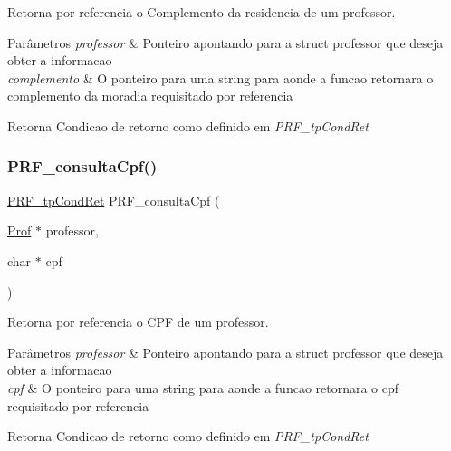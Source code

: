 Retorna por referencia o Complemento da residencia de um professor. 


\begin{DoxyParams}{Parâmetros}
{\em professor} & Ponteiro apontando para a struct professor que deseja obter a informacao \\
\hline
{\em complemento} & O ponteiro para uma string para aonde a funcao retornara o complemento da moradia requisitado por referencia \\
\hline
\end{DoxyParams}
\begin{DoxyReturn}{Retorna}
Condicao de retorno como definido em {\itshape P\+R\+F\+\_\+tp\+Cond\+Ret} 
\end{DoxyReturn}
\mbox{\label{group__funcoes_consulta_gae9e9268cbc4aad856eae4d5dbb322bc1}} 
\subsubsection{\texorpdfstring{P\+R\+F\+\_\+consulta\+Cpf()}{PRF\_consultaCpf()}}
{\footnotesize\ttfamily \hyperlink{group__modulo_professor_ga777e215896d573d2e99d98793b1f0ed1}{P\+R\+F\+\_\+tp\+Cond\+Ret} P\+R\+F\+\_\+consulta\+Cpf (\begin{DoxyParamCaption}\item[{\hyperlink{structprof}{Prof} $\ast$}]{professor,  }\item[{char $\ast$}]{cpf }\end{DoxyParamCaption})}



Retorna por referencia o C\+PF de um professor. 


\begin{DoxyParams}{Parâmetros}
{\em professor} & Ponteiro apontando para a struct professor que deseja obter a informacao \\
\hline
{\em cpf} & O ponteiro para uma string para aonde a funcao retornara o cpf requisitado por referencia \\
\hline
\end{DoxyParams}
\begin{DoxyReturn}{Retorna}
Condicao de retorno como definido em {\itshape P\+R\+F\+\_\+tp\+Cond\+Ret} 
\end{DoxyReturn}
\mbox{\label{group__funcoes_consulta_gad7991a98ebd19eba541712d43c031f30}} 
